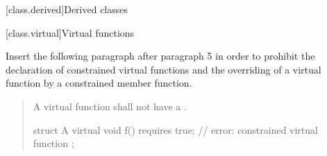 
\setcounter{chapter}{12}
[class.derived]{Derived classes}

\setcounter{section}{2}
[class.virtual]{Virtual functions}

Insert the following paragraph after paragraph 5 in order to
prohibit the declaration of constrained virtual functions and
the overriding of a virtual function by a constrained member
function.

\begin{quote}
\begin{addedblock}
\setcounter{Paras}{5}

\pnum
A virtual function shall not have a .
%
\enterexample
\begin{codeblock}
struct A {
  virtual void f() requires true; // error: constrained virtual function
};
\end{codeblock}
\exitexample
\end{addedblock}
\end{quote}

